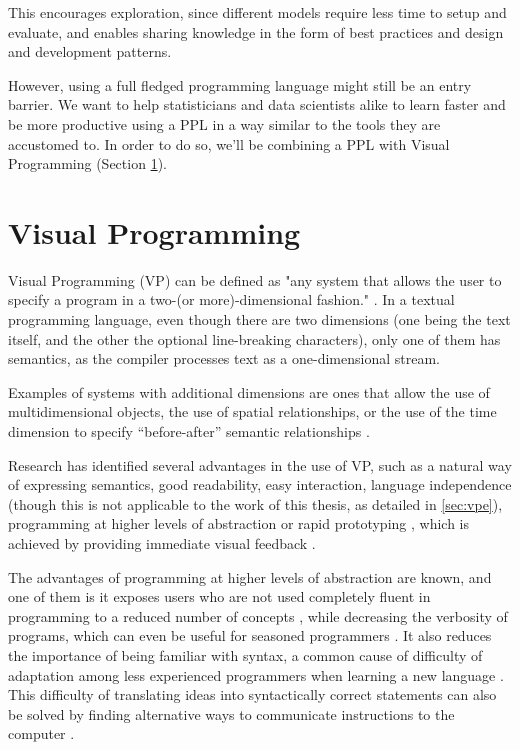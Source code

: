 \begin{itemsize}
This encourages exploration, since
different models require less time to setup and evaluate, and enables sharing
knowledge in the form of best practices and design and development patterns.

However, using a full fledged programming language might still be an entry
barrier. We want to help statisticians and data scientists alike to learn
faster and be more productive using a PPL in a way similar to the tools they
are accustomed to. In order to do so, we'll be combining a PPL with Visual
Programming (Section \ref{sec:vp}).

\section{Visual Programming}
\label{sec:vp}

Visual Programming (VP) can be defined as "any system that allows the user to specify a program in a
two-(or more)-dimensional fashion." \cite{Myers1986}.
In a textual programming language, even though there are two dimensions (one
being the text itself, and the other the optional line-breaking characters),
only one of them has semantics, as the compiler processes text as a
one-dimensional stream.

Examples of systems with additional dimensions are ones that allow the use of
multidimensional objects, the use of spatial relationships, or the use of the
time dimension to specify “before-after” semantic relationships \cite{Burnett1999}.

Research has identified several advantages in the use of VP, such as a natural
way of expressing semantics, good readability, easy interaction, language independence (though
this is not applicable to the work of this thesis, as detailed in \ref{sec:vpe}),
programming at higher levels of abstraction or rapid prototyping \cite{JamalRahmanandWenzel2014},
which is achieved by providing immediate visual feedback \cite{Shu1988}.

The advantages of programming at higher levels of abstraction are known, and
one of them is it exposes users who are not used completely fluent in programming
to a reduced number of concepts \cite{Shu1988}, while decreasing the verbosity of
programs, which can even be useful for seasoned programmers \cite{Myers1990}.
It also reduces the importance of being familiar with syntax, a common cause
of difficulty of adaptation among less experienced programmers when learning
a new language \cite{cunniff1986does}\cite{Carlisle2005}. This difficulty of translating ideas
into syntactically correct statements can also be solved by finding alternative
ways to communicate instructions to the computer \cite{Kelleher2005}.


\end{itemsize}
